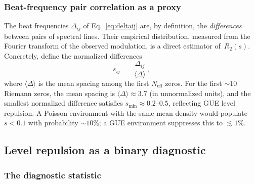 \documentclass[12pt,a4paper]{article}
\begin{document}
\subsubsection{Beat-frequency pair correlation as a proxy}

The beat frequencies $\Delta_{ij}$ of Eq.~\eqref{eq:deltaij}
are, by definition, the \emph{differences} between pairs of
spectral lines.  Their empirical distribution, measured
from the Fourier transform of the observed modulation, is a
direct estimator of~$R_2(s)$.
Concretely, define the normalized differences
\begin{equation}\label{eq:snorm}
  s_{ij}
  \;=\;
  \frac{\Delta_{ij}}{\langle\Delta\rangle}\,,
\end{equation}
where $\langle\Delta\rangle$ is the mean spacing among the
first $N_{\mathrm{eff}}$ zeros.
For the first $\sim\!10$ Riemann zeros, the mean spacing is
$\langle\Delta\rangle\approx 3.7$ (in unnormalized units),
and the smallest normalized difference satisfies
$s_{\min}\approx 0.2$--$0.5$, reflecting GUE level repulsion.
A Poisson environment with the same mean density would
populate $s<0.1$ with probability $\sim 10\%$;
a GUE environment suppresses this to $\lesssim 1\%$.


\subsection{Level repulsion as a binary diagnostic}
\label{sec:levelrepulsion}

\subsubsection{The diagnostic statistic}
\end{document}
